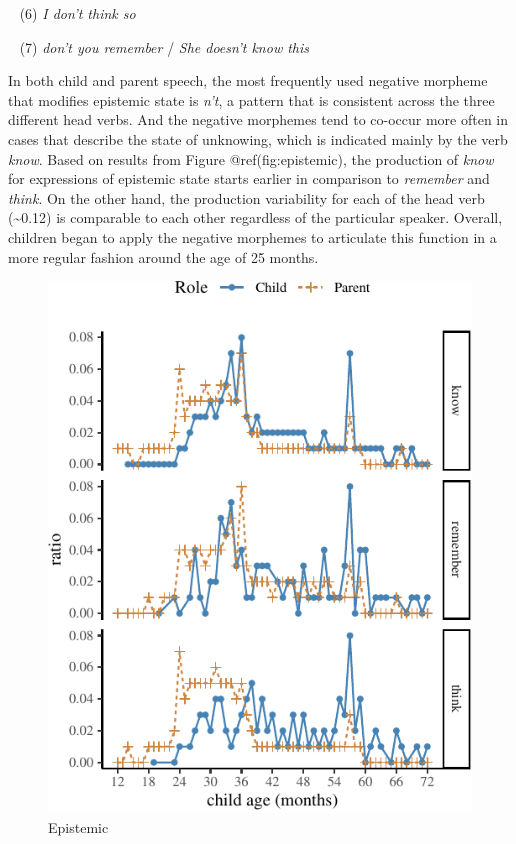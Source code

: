\documentclass[10pt, letterpaper]{article}
\newenvironment{CodeChunk}{}{}
\begin{document}
~ (6) \emph{I don't think so}

~ (7) \emph{don't you remember} / \emph{She doesn't know this}

In both child and parent speech, the most frequently used negative
morpheme that modifies epistemic state is \emph{n't}, a pattern that is
consistent across the three different head verbs. And the negative
morphemes tend to co-occur more often in cases that describe the state
of unknowing, which is indicated mainly by the verb \emph{know}. Based
on results from Figure @ref(fig:epistemic), the production of
\emph{know} for expressions of epistemic state starts earlier in
comparison to \emph{remember} and \emph{think}. On the other hand, the
production variability for each of the head verb (\textasciitilde0.12)
is comparable to each other regardless of the particular speaker.
Overall, children began to apply the negative morphemes to articulate
this function in a more regular fashion around the age of 25 months.

\begin{CodeChunk}
\begin{figure}[H]

{\centering \includegraphics{figs/epistemic-1} 

}

\caption[Epistemic]{Epistemic}\label{fig:epistemic}
\end{figure}
\end{CodeChunk}
\end{document}

